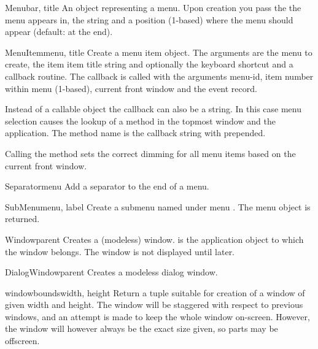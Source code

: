 \begin{funcdesc}{Menu}{bar, title}
An object representing a menu. Upon creation you pass the
 the menu appears in, the  string and a
position (1-based)  where the menu should appear (default:
at the end).
\end{funcdesc}

\begin{funcdesc}{MenuItem}{menu, title}
Create a menu item object. The arguments are the menu to create, the
item item title string and optionally the keyboard shortcut
and a callback routine. The callback is called with the arguments
menu-id, item number within menu (1-based), current front window and
the event record.

Instead of a callable object the callback can also be a string. In
this case menu selection causes the lookup of a method in the topmost
window and the application. The method name is the callback string
with  prepended.

Calling the   method sets the
correct dimming for all menu items based on the current front window.
\end{funcdesc}

\begin{funcdesc}{Separator}{menu}
Add a separator to the end of a menu.
\end{funcdesc}

\begin{funcdesc}{SubMenu}{menu, label}
Create a submenu named  under menu . The menu
object is returned.
\end{funcdesc}

\begin{funcdesc}{Window}{parent}
Creates a (modeless) window.  is the application object to
which the window belongs. The window is not displayed until later.
\end{funcdesc}

\begin{funcdesc}{DialogWindow}{parent}
Creates a modeless dialog window.
\end{funcdesc}

\begin{funcdesc}{windowbounds}{width, height}
Return a 
tuple suitable for creation of a window of given width and height. The
window will be staggered with respect to previous windows, and an
attempt is made to keep the whole window on-screen. However, the window will
however always be the exact size given, so parts may be offscreen.
\end{funcdesc}

